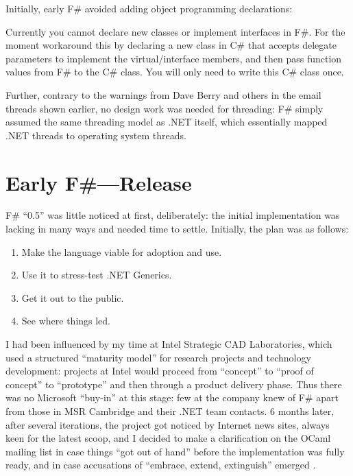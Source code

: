 \documentclass[acmsmall,screen]{acmart}
\begin{document}
Initially, early F\# avoided adding object programming declarations:
\begin{verbquote}
Currently you cannot declare new classes or implement interfaces in F#.  For the moment workaround this by declaring a new class in C# that accepts delegate parameters to implement the virtual/interface members, and then pass function values from F# to the C# class.  You will only need to write this C# class once.
\end{verbquote}

Further, contrary to the warnings from Dave Berry and others in the email threads shown earlier, no design work was needed for threading: F\# simply assumed the same threading model as .NET itself, which essentially mapped .NET threads to operating system threads.



\section*{Early F\#---Release}


F\# “0.5” was little noticed at first, deliberately: the initial implementation was lacking in many ways and needed time to settle. Initially, the plan was as follows: 
\begin{enumerate}
\item Make the language viable for adoption and use.
\item Use it to stress-test .NET Generics.
\item Get it out to the public.
\item See where things led.
\end{enumerate}

I had been influenced by my time at Intel Strategic CAD Laboratories, which used a structured “maturity model” for research projects and
technology development: projects at Intel would proceed from “concept” to “proof of concept” to “prototype” and then through a product
delivery phase. Thus there was no Microsoft “buy-in” at this stage: few at the company knew of F\# apart from those in MSR Cambridge
and their .NET team contacts. 6 months later, after several iterations, the project got noticed by Internet news sites, always keen for the
latest scoop, and I decided to make a clarification on the OCaml mailing list in case things “got out of hand” before the implementation was fully
ready, and in case accusations of “embrace, extend, extinguish” emerged \citep{Boulton2003}.
\end{document}
